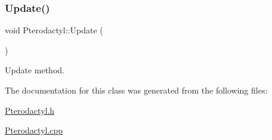 \subsubsection{\texorpdfstring{Update()}{Update()}}
{\footnotesize\ttfamily void Pterodactyl\+::\+Update (\begin{DoxyParamCaption}{ }\end{DoxyParamCaption})}



Update method. 



The documentation for this class was generated from the following files\+:\begin{DoxyCompactItemize}
\item 
\mbox{\hyperlink{_pterodactyl_8h}{Pterodactyl.\+h}}\item 
\mbox{\hyperlink{_pterodactyl_8cpp}{Pterodactyl.\+cpp}}\end{DoxyCompactItemize}
